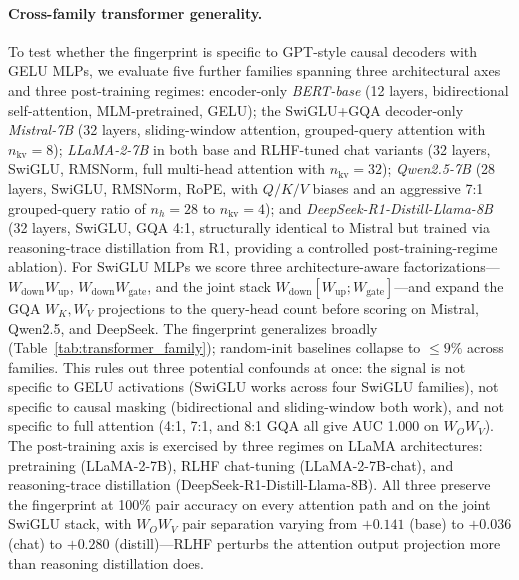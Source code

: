 \documentclass[wcp]{jmlr}
\begin{document}
\paragraph{Cross-family transformer generality.}
To test whether the fingerprint is specific to GPT-style causal decoders with GELU MLPs, we evaluate five further families spanning three architectural axes and three post-training regimes: encoder-only \emph{BERT-base} \citep{devlin2019bert} (12 layers, bidirectional self-attention, MLM-pretrained, GELU); the SwiGLU+GQA decoder-only \emph{Mistral-7B} \citep{jiang2023mistral7b} (32 layers, sliding-window attention, grouped-query attention with $n_{\text{kv}}{=}8$); \emph{LLaMA-2-7B} \citep{touvron2023llama2} in both base and RLHF-tuned chat variants (32 layers, SwiGLU, RMSNorm, full multi-head attention with $n_{\text{kv}}{=}32$); \emph{Qwen2.5-7B} \citep{qwen2.5} (28 layers, SwiGLU, RMSNorm, RoPE, with $Q/K/V$ biases and an aggressive 7{:}1 grouped-query ratio of $n_h{=}28$ to $n_{\text{kv}}{=}4$); and \emph{DeepSeek-R1-Distill-Llama-8B} \citep{deepseek_r1} (32 layers, SwiGLU, GQA 4{:}1, structurally identical to Mistral but trained via reasoning-trace distillation from R1, providing a controlled post-training-regime ablation). For SwiGLU MLPs we score three architecture-aware factorizations---$W_{\text{down}}W_{\text{up}}$, $W_{\text{down}}W_{\text{gate}}$, and the joint stack $W_{\text{down}}[W_{\text{up}};W_{\text{gate}}]$---and expand the GQA $W_K,W_V$ projections to the query-head count before scoring on Mistral, Qwen2.5, and DeepSeek. The fingerprint generalizes broadly (Table~\ref{tab:transformer_family}); random-init baselines collapse to $\le\!9\%$ across families. This rules out three potential confounds at once: the signal is not specific to GELU activations (SwiGLU works across four SwiGLU families), not specific to causal masking (bidirectional and sliding-window both work), and not specific to full attention (4{:}1, 7{:}1, and 8{:}1 GQA all give AUC 1.000 on $W_OW_V$). The post-training axis is exercised by three regimes on LLaMA architectures: pretraining (LLaMA-2-7B), RLHF chat-tuning (LLaMA-2-7B-chat), and reasoning-trace distillation (DeepSeek-R1-Distill-Llama-8B). All three preserve the fingerprint at 100\% pair accuracy on every attention path and on the joint SwiGLU stack, with $W_OW_V$ pair separation varying from $+0.141$ (base) to $+0.036$ (chat) to $+0.280$ (distill)---RLHF perturbs the attention output projection more than reasoning distillation does.
\end{document}
